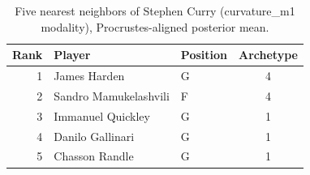 \begin{table}[htbp]
  \centering\small
  \begin{tabular}{rllc}
    \toprule
    Rank & Player & Position & Archetype \\
    \midrule
    1 & James Harden & G & 4 \\
    2 & Sandro Mamukelashvili & F & 4 \\
    3 & Immanuel Quickley & G & 1 \\
    4 & Danilo Gallinari & G & 1 \\
    5 & Chasson Randle & G & 1 \\
    \bottomrule
  \end{tabular}
  \caption{Five nearest neighbors of Stephen Curry (curvature_m1 modality), Procrustes-aligned posterior mean.}
  \label{tab:Stephen_Curry_neighbors_curvature_m1}
\end{table}

